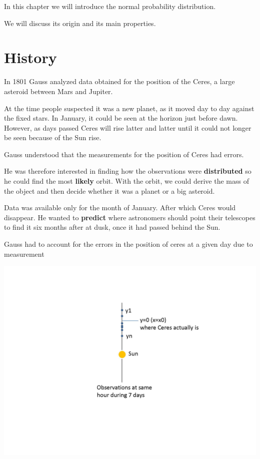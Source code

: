 \documentclass[
]{book}
\begin{document}
In this chapter we will introduce the normal probability distribution.

We will discuss its origin and its main properties.

\hypertarget{history}{%
\section{History}\label{history}}

In 1801 Gauss analyzed data obtained for the position of the Ceres, a large asteroid between Mars and Jupiter.

At the time people suspected it was a new planet, as it moved day to day against the fixed stars. In January, it could be seen at the horizon just before dawn. However, as days passed Ceres will rise latter and latter until it could not longer be seen because of the Sun rise.

Gauss understood that the measurements for the position of Ceres had errors.

He was therefore interested in finding how the observations were \textbf{distributed} so he could find the most \textbf{likely} orbit. With the orbit, we could derive the mass of the object and then decide whether it was a planet or a big asteroid.

Data was available only for the month of January. After which Ceres would disappear. He wanted to \textbf{predict} where astronomers should point their telescopes to find it six months after at dusk, once it had passed behind the Sun.

Gauss had to account for the errors in the position of ceres at a given day due to measurement

\includegraphics{./figures/ceres.JPG}
\end{document}
